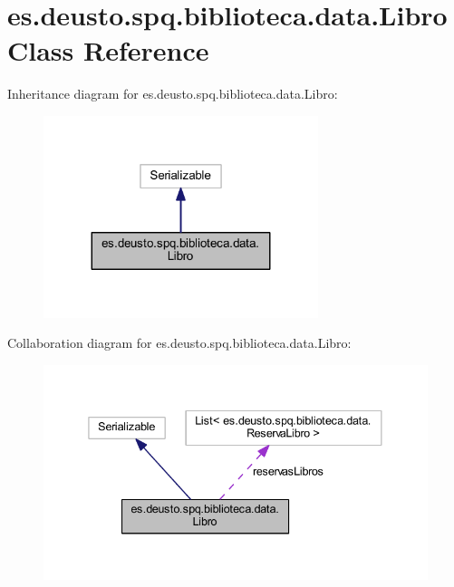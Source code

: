 \hypertarget{classes_1_1deusto_1_1spq_1_1biblioteca_1_1data_1_1_libro}{}\section{es.\+deusto.\+spq.\+biblioteca.\+data.\+Libro Class Reference}
\label{classes_1_1deusto_1_1spq_1_1biblioteca_1_1data_1_1_libro}


Inheritance diagram for es.\+deusto.\+spq.\+biblioteca.\+data.\+Libro\+:
\nopagebreak
\begin{figure}[H]
\begin{center}
\leavevmode
\includegraphics[width=227pt]{classes_1_1deusto_1_1spq_1_1biblioteca_1_1data_1_1_libro__inherit__graph}
\end{center}
\end{figure}


Collaboration diagram for es.\+deusto.\+spq.\+biblioteca.\+data.\+Libro\+:
\nopagebreak
\begin{figure}[H]
\begin{center}
\leavevmode
\includegraphics[width=338pt]{classes_1_1deusto_1_1spq_1_1biblioteca_1_1data_1_1_libro__coll__graph}
\end{center}
\end{figure}

